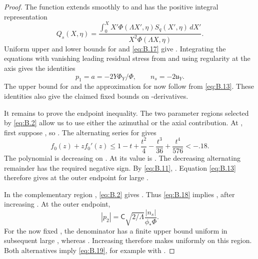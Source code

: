 \begin{proof}
The function  extends smoothly to  and has
the positive integral representation
\begin{equation*}
  Q_s(X,\eta)
  =\frac{\displaystyle\int_0^X X'\Phi(\Lambda X',\eta)S_q(X',\eta)\,dX'}
         {X^2\Phi(\Lambda X,\eta)}.
\end{equation*}
Uniform upper and lower bounds for  and \eqref{eq:B.17} give
. Integrating the equations with vanishing leading residual
stress from  and using regularity at the axis gives the identities
\begin{equation*}
  p_1=a=-2Y\Phi_Y/\Phi,
  \qquad n_s=-2\mathfrak u_Y.
\end{equation*}
The upper bound for  and the approximation for
 now follow from \eqref{eq:B.13}. These identities also give the claimed
fixed bounds on -derivatives.

It remains to prove the endpoint inequality. The two parameter regions selected by \eqref{eq:B.2}
allow us to use either the azimuthal or the axial contribution. At , first
suppose , so . The
alternating series for  gives
\begin{equation*}
  f_0(z)+zf_0'(z)\leq1-t+\frac{t^2}{4}-\frac{t^3}{36}+\frac{t^4}{576}<-.18.
\end{equation*}
The polynomial is decreasing on . At
 its value is
. The decreasing alternating remainder has the
required negative sign. By \eqref{eq:B.11},
%
. Equation \eqref{eq:B.13}
therefore gives  at the outer endpoint for large
.

In the complementary region , \eqref{eq:B.2} gives
. Thus \eqref{eq:B.18} implies
, after increasing
. At the outer endpoint,
\begin{equation*}
  |p_2|=\mathsf C\sqrt{2/\Lambda}\frac{|n_s|}{\phi_*\Phi}.
\end{equation*}
For the now fixed , the denominator has a finite upper bound uniform
in subsequent large , whereas .
Increasing  therefore makes
 uniformly on this region. Both alternatives imply
\eqref{eq:B.19}, for example with .
\end{proof}

